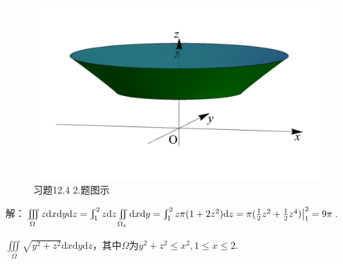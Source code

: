 \documentclass[12pt,UTF8]{ctexart}
\newcommand{\Int}[4]{\varint\nolimits_{#1}^{#2}#3\mathrm d#4}
\newcommand{\varIInt}[4]{\iint\limits_{#1}#2\mathrm d#3\mathrm d#4}
\newcommand{\varIIInt}[5]{\iiint\limits_{#1}#2\mathrm d#3\mathrm d#4\mathrm d#5}
\begin{document}
\begin{enumerate}
\begin{figure}[H]
\begin{center}
\includegraphics[height=0.4\textheight]{Figures19/Fig12-4-2.pdf}
\end{center}
\caption{习题12.4 2.题图示}
\label{12-4-2}
\end{figure}

解：$\varIIInt{\Omega}zxyz=\Int12zz\varIInt{\Omega_z}{}xy=\Int12{z\pi(1+2z^2)}z=\pi(\frac12z^2+\frac12z^4)\big|_1^2=9\pi$.

$\varIIInt\Omega{\sqrt{y^2+z^2}}xyz$，其中$\Omega$为$y^2+z^2\leqslant x^2,1\leqslant x\leqslant2$.


\end{enumerate}
\end{document}
